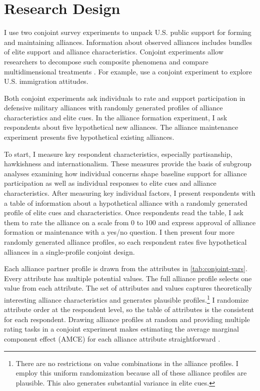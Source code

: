 \documentclass[12pt]{article}
\begin{document}
\section{Research Design}


I use two conjoint survey experiments to unpack U.S. public support for forming and maintaining alliances. 
Information about observed alliances includes bundles of elite support and alliance characteristics. 
Conjoint experiments allow researchers to decompose such composite phenomena and compare multidimensional treatments \citep{Hainmuelleretal2014}. 
For example, \citet{HainmuellerHopkins2015} use a conjoint experiment to explore U.S. immigration attitudes. 


Both conjoint experiments ask individuals to rate and support participation in defensive military alliances with randomly generated profiles of alliance characteristics and elite cues. 
In the alliance formation experiment, I ask respondents about five hypothetical new alliances. 
The alliance maintenance experiment presents five hypothetical existing alliances.


To start, I measure key respondent characteristics, especially partisanship, hawkishness and internationalism.  
These measures provide the basis of subgroup analyses examining how individual concerns shape baseline support for alliance participation as well as individual responses to elite cues and alliance characteristics. 
After measuring key individual factors, I present respondents with a table of information about a hypothetical alliance with a randomly generated profile of elite cues and characteristics.
Once respondents read the table, I ask them to rate the alliance on a scale from 0 to 100 and express approval of alliance formation or maintenance with a yes/no question. 
I then present four more randomly generated alliance profiles, so each respondent rates five hypothetical alliances in a single-profile conjoint design.%


Each alliance partner profile is drawn from the attributes in \autoref{tab:conjoint-vars}.
Every attribute has multiple potential values.
The full alliance profile selects one value from each attribute. 
The set of attributes and values captures theoretically interesting alliance characteristics and generates plausible profiles.\footnote{There are no restrictions on value combinations in the alliance profiles. I employ this uniform randomization because all of these alliance profiles are plausible. This also generates substantial variance in elite cues.}
I randomize attribute order at the respondent level, so the table of attributes is the consistent for each respondent. 
Drawing alliance profiles at random and providing multiple rating tasks in a conjoint experiment makes estimating the average marginal component effect (AMCE) for each alliance attribute straightforward \citep{Hainmuelleretal2014}. 
\end{document}
